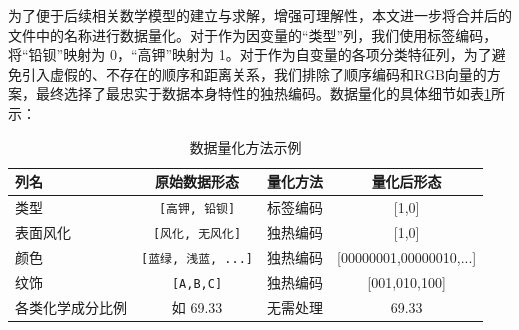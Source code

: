 为了便于后续相关数学模型的建立与求解，增强可理解性，本文进一步将合并后的文件中的名称进行数据量化。对于作为因变量的“类型”列，我们使用标签编码，将“铅钡”映射为 0，“高钾”映射为 1。对于作为自变量的各项分类特征列，为了避免引入虚假的、不存在的顺序和距离关系，我们排除了顺序编码和RGB向量的方案，最终选择了最忠实于数据本身特性的独热编码。数据量化的具体细节如表\ref{tab:quantification_example}所示：
\begin{table}[h!]
	\centering
	\caption{数据量化方法示例}
	\label{tab:quantification_example}
	\renewcommand{\arraystretch}{1.5} %
	\begin{tabular}{lccc}
		\toprule
		\textbf{列名} & \textbf{原始数据形态}               & \textbf{量化方法} & \textbf{量化后形态}                                \\
		\midrule
		\rowcolor{gray!20}
		类型          & \texttt{[高钾, 铅钡]}         & 标签编码          & [1,0]                        \\
		表面风化        & \texttt{[风化, 无风化]}        & 独热编码          & [1,0] \\
		\rowcolor{gray!20}
		颜色          & \texttt{[蓝绿, 浅蓝, ...]}    & 独热编码          & [00000001,00000010,...] \\
		纹饰          & \texttt{[A,B,C]} & 独热编码          & [001,010,100] \\
				\rowcolor{gray!20}
		各类化学成分比例    & 如 69.33                       & 无需处理          & 69.33                                         \\
		\bottomrule
	\end{tabular}
\end{table}

